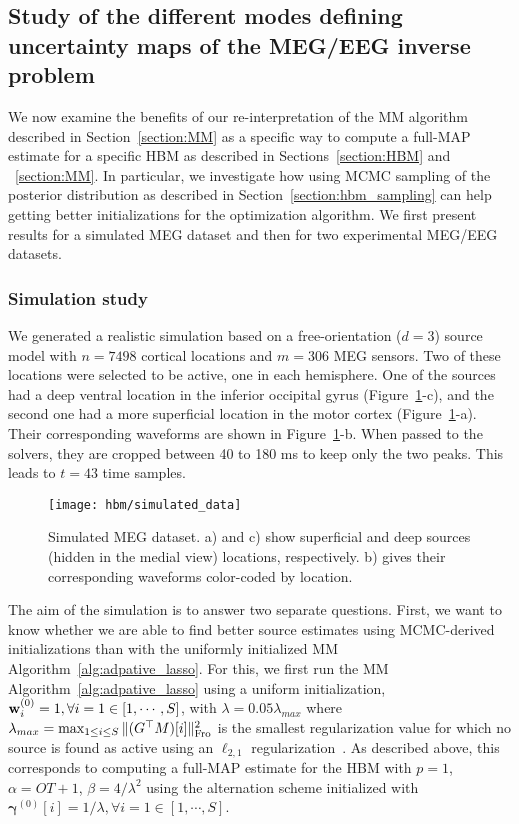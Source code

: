 \subsection{Study of the different modes defining uncertainty maps of the MEG/EEG inverse problem}

We now examine the benefits of our re-interpretation of the MM algorithm described in Section~\ref{section:MM} as a specific way to compute a full-MAP estimate for a specific HBM as described in Sections~\ref{section:HBM} and ~\ref{section:MM}.
In particular, we investigate how using MCMC sampling of the posterior distribution as described in Section~\ref{section:hbm_sampling} can help getting better initializations for the optimization algorithm.
We first present results for a simulated MEG dataset and then for two experimental MEG/EEG datasets.

\subsubsection{Simulation study}
We generated a realistic simulation based on a free-orientation ($d=3$) source model with $n=7498$ cortical locations and $m=306$ MEG sensors. Two of these locations were selected to be active, one in each hemisphere. One of the sources had a deep ventral location in the inferior occipital gyrus (Figure~\ref{fig:simulated_data}-c), and the second one had a more superficial location in the motor cortex (Figure~\ref{fig:simulated_data}-a). Their corresponding waveforms are shown in Figure~\ref{fig:simulated_data}-b. When passed to the solvers, they are cropped between 40 to 180 ms to keep only the two peaks. This leads to $t=43$ time samples.

\begin{figure}[htp]
	\centering
	\texttt{[image: hbm/simulated\_data]}%

	\caption{Simulated MEG dataset. a) and c) show superficial and deep sources (hidden in the medial view) locations, respectively. b) gives their corresponding waveforms color-coded by location.}
	\label{fig:simulated_data}
\end{figure}

The aim of the simulation is to answer two separate questions. First, we want to know whether we are able to find better source estimates using MCMC-derived initializations than with the uniformly initialized MM Algorithm~\ref{alg:adpative_lasso}.
For this, we first run the MM Algorithm~\ref{alg:adpative_lasso} using a uniform initialization, \ie $\mathbf{w}^{(0)}_{i} = 1, \forall i=1\in [1,\cdots,S]$, with $\lambda = 0.05\lambda_{max}$ where $\lambda_{max}= \max_{1 \leq i \leq S} \|{(G^\top M)[i]}\|_{\rm Fro}^2$ is the smallest regularization value for which no source is found as active using an $\ell_{2,1}$ regularization~\cite{Ndiaye_Fercoq_Gramfort_Salmon15,strohmeier-etal:16}. As described above, this corresponds to computing a full-MAP estimate for the HBM with $p=1$, $\alpha = OT +1 $, $\beta = 4/\lambda^2$ using the alternation scheme \label{eq:AO-nu0-X} initialized with $\mathbf{\gamma}^{(0)}[i] = 1/\lambda, \forall i=1\in [1, \cdots, S]$.

